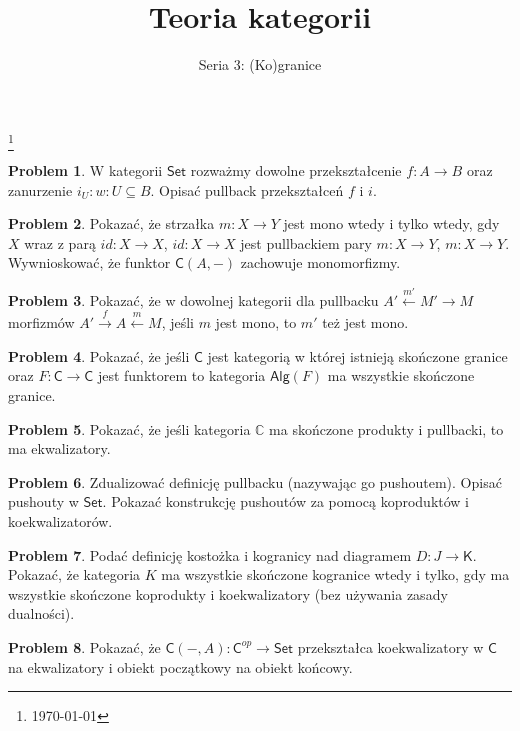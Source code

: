\documentclass[10pt]{amsart}
\title{Teoria kategorii}
\author{Seria 3: (Ko)granice}
\theoremstyle{plain}
\theoremstyle{definition}
\newtheorem{problem}{Problem}
\numberwithin{equation}{section}
\newcommand\blfootnote[1]{%
  \begingroup
  \renewcommand\thefootnote{}\footnote{#1}%
  \addtocounter{footnote}{-1}%
  \endgroup
}
\begin{document}
\maketitle

\blfootnote{\today}

\begin{problem}
W kategorii $\mathsf{Set}$ rozważmy dowolne przekształcenie $f:A\to B$ oraz zanurzenie $i_U:w:U\subseteq B$. Opisać pullback przekształceń $f$ i $i$.
\end{problem}

\begin{problem}
Pokazać, że strzałka $m:X\to Y$ jest mono wtedy i tylko wtedy, gdy $X$ wraz z parą $id:X\to X$, $id:X\to X$ jest pullbackiem pary $m:X\to Y$, $m:X\to Y$. Wywnioskować, że funktor $\mathsf{C}(A,-)$ zachowuje monomorfizmy.
\end{problem}

\begin{problem}
Pokazać, że w dowolnej kategorii dla pullbacku  $A'\stackrel{m'}{\leftarrow} M'\rightarrow M$ morfizmów $A'\stackrel{f}{\rightarrow } A\stackrel{m}{\leftarrow }M$, jeśli $m$ jest mono, to $m'$ też jest mono. 
\end{problem}

\begin{problem}
Pokazać, że jeśli $\mathsf{C}$ jest kategorią w której istnieją skończone granice oraz $F:\mathsf{C}\to \mathsf{C}$ jest funktorem to kategoria $\mathsf{Alg}(F)$ ma wszystkie skończone granice. 
\end{problem}

\begin{problem}
Pokazać, że jeśli kategoria $\mathbb{C}$ ma skończone produkty i pullbacki, to ma ekwalizatory.
\end{problem}

\begin{problem}
Zdualizować definicję pullbacku (nazywając go pushoutem). Opisać pushouty w $\mathsf{Set}$. Pokazać konstrukcję pushoutów za pomocą koproduktów i koekwalizatorów. 
\end{problem}

\begin{problem}
Podać definicję kostożka i kogranicy nad diagramem $D:J\to \mathsf{K}$. Pokazać, że kategoria $K$ ma wszystkie skończone kogranice wtedy i tylko, gdy ma wszystkie skończone koprodukty i koekwalizatory (bez używania zasady dualności). 
\end{problem}

\begin{problem}
Pokazać, że $\mathsf{C}(-,A):\mathsf{C}^{op}\to \mathsf{Set}$ przekształca koekwalizatory w $\mathsf{C}$ na ekwalizatory i obiekt początkowy na obiekt końcowy.
\end{problem}
\end{document}
